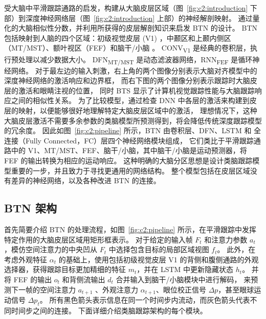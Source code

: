 受大脑中平滑跟踪通路的启发，构建从大脑皮层区域（图~\ref{fig:c2:introduction} 下部）到深度神经网络层（图~\ref{fig:c2:introduction} 上部）的神经解剖映射。
通过量化的大脑相似性分数，并利用所获得的皮层解剖知识来启发 BTN 的设计。
BTN 包括映射到人脑的四个区域：初级视觉皮层 (V1) ，中颞区和上颞内侧区（MT/MST）、额叶视区（FEF）和脑干/小脑 。
CONV\textsubscript{V1} 是经典的卷积层，执行预处理以减少数据大小。
DFN\textsubscript{MT/MST} 是动态滤波器网络，RNN\textsubscript{FEF} 是循环神经网络。
对于最左边的输入刺激，右上角的两个图像分别表示大脑对齐模型中的深度神经网络的激活响应和边界框，
而右下图的两个图像分别表示跟踪时大脑皮层的激活和眼睛注视的位置，
同时 BTS 显示了计算机视觉跟踪性能与大脑跟踪响应之间的相似性关系。
为了比较模型，通过检查 DNN 中各层的激活来构建到皮层的映射，以便能够很好地理解特定大脑皮层区域中的激活，
理想情况下，这种大脑皮层激活不需要多余参数的类脑模型所预测得到，将会降低传统深度跟踪模型的冗余度。
因此如图~\ref{fig:c2:pipeline} 所示，BTN 由卷积层、DFN、LSTM 和 全连接（Fully Connected，FC）层四个神经网络模块组成，
它们类比于平滑跟踪通路中的 V1、MT/MST、FEF、脑干/小脑，其中脑干/小脑是运动预测器，将 FEF 的输出转换为相应的运动响应。
这种明确的大脑分区思想是设计类脑跟踪模型重要的一步，并且致力于寻找更通用的网络结构。
整个模型包括在皮层区域没有差异的神经网络，以及各种改进 BTN 的连接。





\subsection{BTN 架构}
首先简要介绍 BTN 的处理流程，如图~\ref{fig:c2:pipeline} 所示，在平滑跟踪中发挥特定作用的大脑皮层区域用矩形框表示。
对于给定的输入帧 $F_t$ 和注意力参数 $a_t$，模仿空间注意力的中央凹从 $F_t$ 中选择包含目标的局部区域视图 $f_t$。
此外，在考虑外观特征 $\alpha_t$ 的基础上，使用包括初级视觉皮层 V1 的背侧和腹侧通路的外观选择器，获得跟踪目标更加精细的特征 $m_t$，并在 LSTM 中更新隐藏状态 $h_t$。
并将 FEF 的输出 $o_t$ 和背侧流输出 $d_t$ 合并输入到脑干/小脑模块中进行解码，
来预测下一帧的空间注意力 $a_{t+1}$ 、外观注意力 $\alpha_{t +1}$、眼位校正信号 $\Delta p$，甚至眼球运动信号 $\Delta p_t$。
所有黑色箭头表示信息在同一个时间步内流动，而灰色箭头代表不同时间步之间的连接。
下面详细介绍类脑跟踪架构的每个模块。

